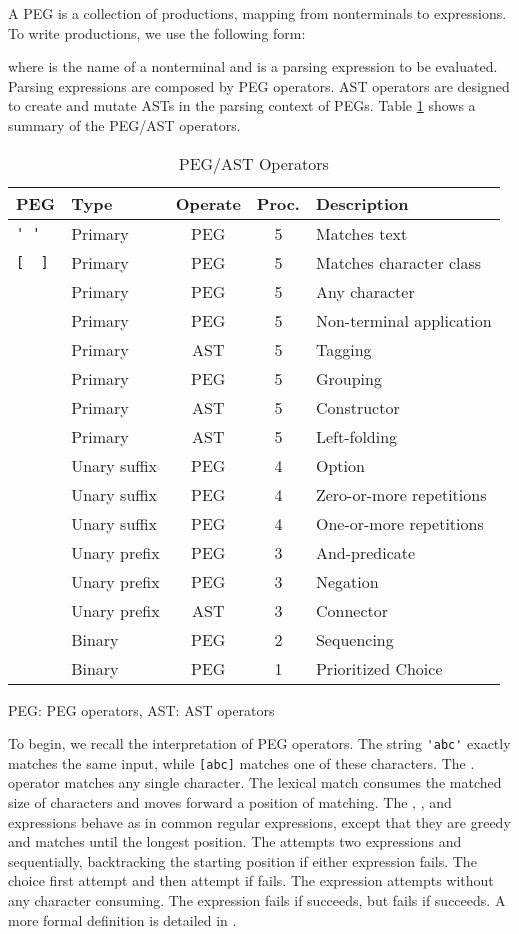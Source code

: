 \documentclass[JIP]{ipsj}
\begin{document}
A PEG is a collection of productions, mapping from nonterminals to expressions. To write productions, we use the following form:

\noindent
where  is the name of a nonterminal and  is a parsing expression to be evaluated. Parsing expressions are composed by PEG operators. AST operators are designed to create and mutate ASTs in the parsing context of PEGs. Table \ref{table:peg4d} shows a summary of the PEG/AST operators. 

\begin{table}[bt]
\begin{center}
\caption{PEG/AST Operators} 
\label{table:peg4d}
\begin{tabular}{llccl} \hline
PEG  & Type & Operate & Proc. & Description\\ \hline
\verb|' '| & Primary & PEG & 5 & Matches text\\
\verb|[  ]| & Primary & PEG & 5& Matches character class \\
 & Primary & PEG & 5 & Any character\\
 & Primary & PEG & 5 & Non-terminal application\\
 & Primary & AST & 5 & Tagging \\
 & Primary & PEG & 5 & Grouping\\
 & Primary & AST & 5 & Constructor\\
 & Primary & AST & 5 & Left-folding\\
 & Unary suffix & PEG & 4 & Option\\
 & Unary suffix & PEG & 4 & Zero-or-more repetitions\\
 & Unary suffix & PEG & 4 & One-or-more repetitions\\
 & Unary prefix & PEG & 3 & And-predicate\\
 & Unary prefix & PEG& 3 & Negation\\
 & Unary prefix & AST& 3 & Connector \\
 & Binary & PEG& 2 & Sequencing\\
 & Binary & PEG & 1 & Prioritized Choice\\ \hline
\end{tabular}
PEG: PEG operators, AST: AST operators
\end{center}
\end{table}

To begin, we recall the interpretation of PEG operators. The string \verb|'abc'| exactly matches the same input, while \verb|[abc]| matches one of these characters. The . operator matches any single character. The lexical match consumes the matched size of characters and moves forward a position of matching. The , , and  expressions behave as in common regular expressions, except that they are greedy and matches until the longest position. The  attempts two expressions  and  sequentially, backtracking the starting position if either expression fails.  The choice  first attempt  and then attempt  if  fails. The expression  attempts  without any character consuming. The expression  fails if  succeeds, but fails if  succeeds. A more formal definition is detailed in \cite{POPL04_PEG}.
\end{document}
